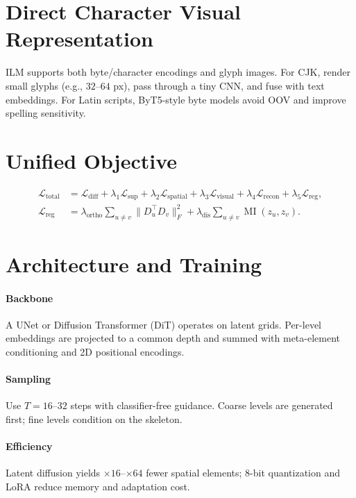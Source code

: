 \documentclass[11pt]{article}
\begin{document}
\section{Direct Character Visual Representation}
ILM supports both byte/character encodings and glyph images. For CJK, render small glyphs (e.g., $32$--$64$ px), pass through a tiny CNN, and fuse with text embeddings. For Latin scripts, ByT5-style byte models avoid OOV and improve spelling sensitivity.

\section{Unified Objective}
\begin{align}
\mathcal{L}_{\text{total}} 
&= \mathcal{L}_{\text{diff}} 
 + \lambda_1 \mathcal{L}_{\text{sup}} 
 + \lambda_2 \mathcal{L}_{\text{spatial}} 
 + \lambda_3 \mathcal{L}_{\text{visual}} 
 + \lambda_4 \mathcal{L}_{\text{recon}} 
 + \lambda_5 \mathcal{L}_{\text{reg}}, \\[-2pt]
\mathcal{L}_{\text{reg}} &= \lambda_{\text{ortho}} \sum_{u\neq v}\|D_u^\top D_v\|_F^2 + \lambda_{\text{dis}}\sum_{u\neq v} \operatorname{MI}(z_u,z_v).
\end{align}

\section{Architecture and Training}
\paragraph{Backbone} A UNet or Diffusion Transformer (DiT) operates on latent grids. Per-level embeddings are projected to a common depth and summed with meta-element conditioning and 2D positional encodings.

\paragraph{Sampling} Use $T{=}16$--$32$ steps with classifier-free guidance. Coarse levels are generated first; fine levels condition on the skeleton.

\paragraph{Efficiency} Latent diffusion yields $\times 16$--$\times 64$ fewer spatial elements; 8-bit quantization and LoRA reduce memory and adaptation cost.
\end{document}
